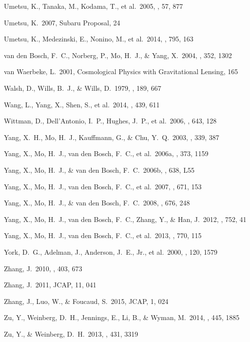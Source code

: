 \documentclass[apj]{emulateapj}
\begin{document}
\begin{thebibliography}{}
  Umetsu, K., Tanaka, M.,
  Kodama, T., et al.\ 2005, \pasj, 57, 877

  Umetsu, K.\ 2007, Subaru
  Proposal, 24

  Umetsu, K., Medezinski,
  E., Nonino, M., et al.\ 2014, \apj, 795, 163

  van den Bosch,
  F.~C., Norberg, P., Mo, H.~J., \& Yang, X.\ 2004, \mnras, 352, 1302

  van Waerbeke, L.\ 2001,
Cosmological Physics with Gravitational Lensing, 165

  Walsh, D., Wills, B.~J.,
  \& Wills, D.\ 1979, \mnras, 189, 667


  Wang, L., Yang, X., Shen,
  S., et al.\ 2014, \mnras, 439, 611
  
   Wittman, D., 
Dell'Antonio, I.~P., Hughes, J.~P., et al.\ 2006, \apj, 643, 128 



  Yang, X.~H., Mo, H.~J.,
Kauffmann, G., \& Chu, Y.~Q.\ 2003, \mnras, 339, 387


 Yang, X., Mo, H.~J., van
den Bosch, F.~C., et al.\ 2006a, \mnras, 373, 1159


 Yang, X., Mo, H.~J.,
\& van den Bosch, F.~C.\ 2006b, \apjl, 638, L55


  Yang, X., Mo, H.~J., van
 den Bosch, F.~C., et al.\ 2007, \apj, 671, 153

  Yang, X., Mo, H.~J.,
   \& van den Bosch, F.~C.\ 2008, \apj, 676, 248

 Yang, X., Mo, H.~J., van den
  Bosch, F.~C., Zhang, Y., \& Han, J.\ 2012, \apj, 752, 41

  Yang, X., Mo, H.~J., van den
   Bosch, F.~C., et al.\ 2013, \apj, 770, 115


  York, D.~G., Adelman, J.,
 Anderson, J.~E., Jr., et al.\ 2000, \aj, 120, 1579

   Zhang, J.\ 2010, \mnras, 403,
 673

  Zhang, J.\ 2011, JCAP, 11, 041


  Zhang, J., Luo, W.,
  \& Foucaud, S.\ 2015, JCAP, 1, 024


 Zu, Y., Weinberg, D.~H.,
  Jennings, E., Li, B., \& Wyman, M.\ 2014, \mnras, 445, 1885

  Zu, Y.,
  \& Weinberg, D.~H.\ 2013, \mnras, 431, 3319


\end{thebibliography}
\end{document}
